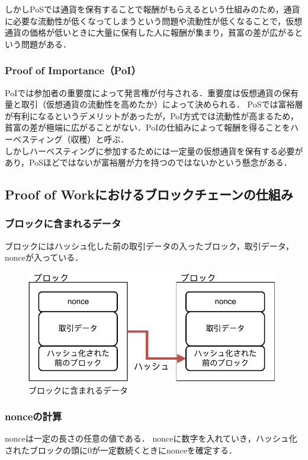 \documentclass[a4j,12pt]{jsarticle}
\begin{document}
しかしPoSでは通貨を保有することで報酬がもらえるという仕組みのため，通貨に必要な流動性が低くなってしまうという問題や流動性が低くなることで，仮想通貨の価格が低いときに大量に保有した人に報酬が集まり，貧富の差が広がるという問題がある．

\subsubsection{Proof of Importance（PoI）}

PoIでは参加者の重要度によって発言権が付与される．重要度は仮想通貨の保有量と取引（仮想通貨の流動性を高めたか）によって決められる．
PoSでは富裕層が有利になるというデメリットがあったが，PoI方式では流動性が高まるため，貧富の差が極端に広がることがない．PoIの仕組みによって報酬を得ることをハーベスティング（収穫）と呼ぶ．\\

しかしハーベスティングに参加するためには一定量の仮想通貨を保有する必要があり，PoSほどではないが富裕層が力を持つのではないかという懸念がある．



\newpage
\subsection{Proof of Workにおけるブロックチェーンの仕組み}
\subsubsection{ブロックに含まれるデータ}
ブロックにはハッシュ化した前の取引データの入ったブロック，取引データ，nonceが入っている．

\begin{figure}[H]
\centering
\includegraphics[width=11cm]{block2.pdf}
\caption{ブロックに含まれるデータ}
\label{fig:no}
\end{figure} 


\subsubsection{nonceの計算}
nonceは一定の長さの任意の値である．
nonceに数字を入れていき，ハッシュ化されたブロックの頭に0が一定数続くときにnonceを確定する．
\end{document}

